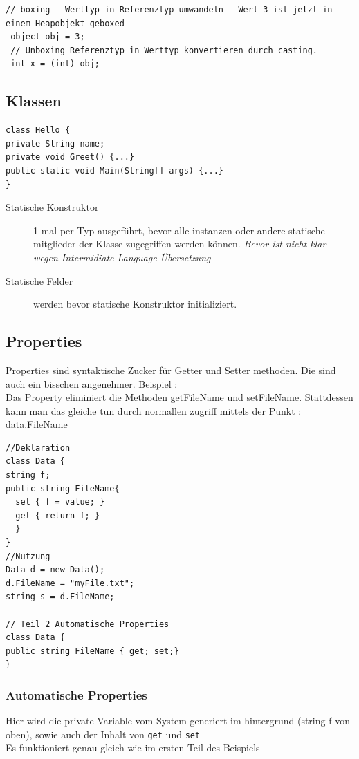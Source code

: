 \documentclass[a4paper,10pt]{scrartcl}
\begin{document}
\begin{lstlisting}[caption=Boxing und Unboxing]
 // boxing - Werttyp in Referenztyp umwandeln - Wert 3 ist jetzt in einem Heapobjekt geboxed
 object obj = 3;
 // Unboxing Referenztyp in Werttyp konvertieren durch casting.
 int x = (int) obj;
\end{lstlisting}

\subsection{Klassen}
\begin{lstlisting}[caption=Deklaration von eine Klasse]
class Hello {
private String name;
private void Greet() {...}
public static void Main(String[] args) {...}
}
\end{lstlisting}

\begin{description}
 \item [Statische Konstruktor] 1 mal per Typ ausgeführt, bevor alle instanzen oder andere statische mitglieder der Klasse 
 zugegriffen werden können. \textit{Bevor ist nicht klar wegen Intermidiate Language Übersetzung}
 \item[Statische Felder] werden bevor statische Konstruktor initializiert.
\end{description}

\subsection{Properties}
Properties sind syntaktische Zucker für Getter und Setter methoden. Die sind auch ein bisschen angenehmer.
Beispiel : \\
Das Property eliminiert die Methoden getFileName und setFileName. Stattdessen kann man das gleiche tun durch normallen zugriff mittels der Punkt :\\
data.FileName

\begin{lstlisting}[caption=Properties Beispiel]
//Deklaration
class Data {
string f;
public string FileName{ 
  set { f = value; }
  get { return f; }
  }
}
//Nutzung
Data d = new Data();
d.FileName = "myFile.txt";
string s = d.FileName;

// Teil 2 Automatische Properties
class Data {
public string FileName { get; set;}
}

\end{lstlisting}

\subsubsection{Automatische Properties}
Hier wird die private Variable vom System generiert im hintergrund (string f von oben), sowie auch der Inhalt von \texttt{get} und \texttt{set}\\
Es funktioniert genau gleich wie im ersten Teil des Beispiels
\end{document}
